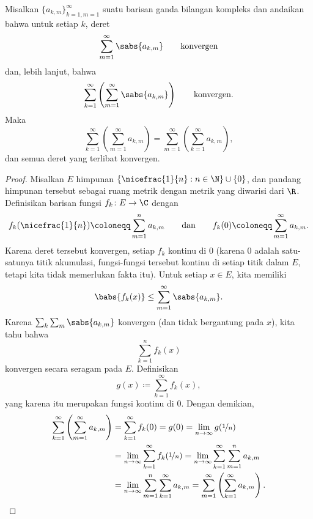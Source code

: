 \begin{thm} \label{thm:fubiniforsums}
Misalkan $\{ a_{k,m} \}_{k=1,m=1}^\infty$ suatu barisan ganda
bilangan kompleks dan andaikan bahwa untuk setiap $k$, deret
\begin{equation*}
\sum_{m=1}^\infty \sabs{a_{k,m}} \qquad \text{konvergen}
\end{equation*}
dan, lebih lanjut, bahwa
\begin{equation*}
\sum_{k=1}^\infty \left( \sum_{m=1}^\infty \sabs{a_{k,m}} \right)
\qquad \text{konvergen}.
\end{equation*}
Maka
\begin{equation*}
\sum_{k=1}^\infty \left( \sum_{m=1}^\infty a_{k,m} \right)
=
\sum_{m=1}^\infty \left( \sum_{k=1}^\infty a_{k,m} \right) ,
\end{equation*}
dan semua deret yang terlibat konvergen.
\end{thm}

\begin{proof}
Misalkan $E$ himpunan $\{ \nicefrac{1}{n} : n \in \N \} \cup \{ 0 \}$,
dan pandang himpunan tersebut sebagai ruang metrik dengan metrik yang diwarisi dari $\R$.
Definisikan barisan fungsi $f_k \colon E \to \C$
dengan
\begin{equation*}
f_k(\nicefrac{1}{n}) \coloneqq \sum_{m=1}^n a_{k,m}
\qquad
\text{dan}
\qquad
f_k(0) \coloneqq \sum_{m=1}^\infty a_{k,m} .
\end{equation*}
Karena deret tersebut konvergen, setiap $f_k$ kontinu di $0$
(karena 0 adalah satu-satunya titik akumulasi, fungsi-fungsi tersebut kontinu di setiap titik
dalam $E$, tetapi kita tidak memerlukan fakta itu).
Untuk setiap $x \in E$, kita memiliki
\begin{equation*}
\babs{f_k(x)} \leq \sum_{m=1}^\infty \sabs{a_{k,m}} .
\end{equation*}
Karena $\sum_k \sum_m \sabs{a_{k,m}}$ konvergen (dan tidak bergantung pada
$x$), kita tahu bahwa
\begin{equation*}
\sum_{k=1}^n f_k(x)
\end{equation*}
konvergen secara seragam pada $E$.  Definisikan
\begin{equation*}
g(x) \coloneqq \sum_{k=1}^\infty f_k(x) ,
\end{equation*}
yang karena itu merupakan fungsi kontinu di $0$.
Dengan demikian,
\begin{equation*}
\begin{split}
\sum_{k=1}^\infty \left( \sum_{m=1}^\infty a_{k,m} \right)
& =
\sum_{k=1}^\infty f_k(0)
= g(0)
= \lim_{n\to\infty} g(\nicefrac{1}{n}) \\
&= 
\lim_{n\to\infty}\sum_{k=1}^\infty f_k(\nicefrac{1}{n})
= 
\lim_{n\to\infty}\sum_{k=1}^\infty \sum_{m=1}^n a_{k,m} \\
&= 
\lim_{n\to\infty}\sum_{m=1}^n \sum_{k=1}^\infty a_{k,m}
= 
\sum_{m=1}^\infty \left( \sum_{k=1}^\infty a_{k,m} \right) . \qedhere
\end{split}
\end{equation*}
\end{proof}

